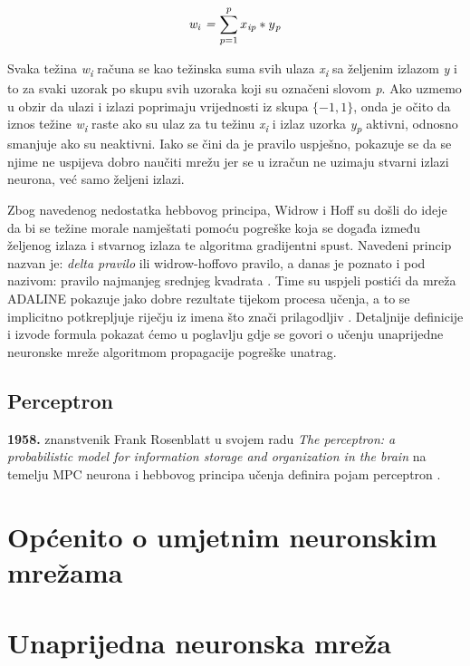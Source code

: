 \documentclass[times, utf8, zavrsni]{fer}
\begin{document}
\begin{equation}
    \textit{w\textsubscript{i} = $\sum\limits_{p = 1}^p x\textsubscript{ip} * y\textsubscript{p}$}
\end{equation}

Svaka težina \textit{w\textsubscript{i}} računa se kao težinska suma svih ulaza \textit{x\textsubscript{i}} sa željenim izlazom \textit{y} i to za svaki uzorak po skupu svih uzoraka koji su označeni slovom \textit{p}. Ako uzmemo u obzir da ulazi i izlazi poprimaju vrijednosti iz skupa $\{-1, 1\}$, onda je očito da iznos težine \textit{w\textsubscript{i}} raste ako su ulaz za tu težinu \textit{x\textsubscript{i}} i izlaz uzorka \textit{y\textsubscript{p}} aktivni, odnosno smanjuje ako su neaktivni. Iako se čini da je pravilo uspješno, pokazuje se da se njime ne uspijeva dobro naučiti mrežu jer se u izračun ne uzimaju stvarni izlazi neurona, već samo željeni izlazi.

Zbog navedenog nedostatka hebbovog principa, Widrow i Hoff su došli do ideje da bi se težine morale namještati pomoću pogreške  koja se događa između željenog izlaza i stvarnog izlaza te algoritma gradijentni spust. Navedeni princip nazvan je: \textit{delta pravilo}  ili widrow-hoffovo pravilo, a danas je poznato i pod nazivom: pravilo najmanjeg srednjeg kvadrata . Time su uspjeli postići da mreža ADALINE pokazuje jako dobre rezultate tijekom procesa učenja, a to se implicitno potkrepljuje riječju  iz imena što znači prilagodljiv \citep{picton2000}. Detaljnije definicije i izvode formula pokazat ćemo u poglavlju gdje se govori o učenju unaprijedne neuronske mreže algoritmom propagacije pogreške unatrag.

\subsection{Perceptron}
\textbf{1958.} znanstvenik Frank Rosenblatt u svojem radu \textit{The perceptron: a probabilistic model for information storage and organization in the brain} na temelju MPC neurona i hebbovog principa učenja definira pojam perceptron .

\section{Općenito o umjetnim neuronskim mrežama}

\section{Unaprijedna neuronska mreža}
\end{document}
